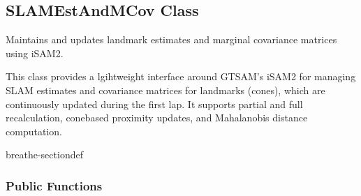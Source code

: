 \documentclass[letterpaper,10pt,english]{sphinxmanual}
\begin{document}
\subsection{SLAMEstAndMCov Class}
\label{\detokenize{isam2:slamestandmcov-class}}

\begin{fulllineitems}
\label{\detokenize{isam2:_CPPv4N4slam14SLAMEstAndMCovE}}\label{\detokenize{isam2:_CPPv3N4slam14SLAMEstAndMCovE}}\label{\detokenize{isam2:_CPPv2N4slam14SLAMEstAndMCovE}}\label{\detokenize{isam2:slam::SLAMEstAndMCov}}
\pysigstartsignatures
\pysigstartmultiline
\pysigline
{\label{\detokenize{isam2:classslam_1_1SLAMEstAndMCov}}}
\pysigstopmultiline
\pysigstopsignatures
\sphinxAtStartPar
Maintains and updates landmark estimates and marginal covariance matrices using iSAM2. 

\sphinxAtStartPar
This class provides a lgihtweight interface around GTSAM’s iSAM2 for managing SLAM estimates and covariance matrices for landmarks (cones), which are continuously updated during the first lap. It supports partial and full recalculation, cone\sphinxhyphen{}based proximity updates, and Mahalanobis distance computation. 

\begin{sphinxuseclass}{breathe-sectiondef}\subsubsection*{Public Functions}


\end{sphinxuseclass}
\end{fulllineitems}
\end{document}

